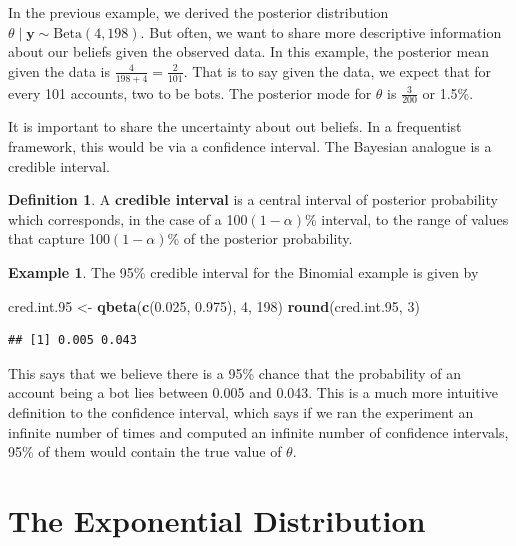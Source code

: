 \documentclass[
]{book}
\newenvironment{Shaded}{\begin{snugshade}}{\end{snugshade}}
\newcommand{\DecValTok}[1]{\textcolor[rgb]{0.00,0.00,0.81}{#1}}
\newcommand{\FloatTok}[1]{\textcolor[rgb]{0.00,0.00,0.81}{#1}}
\newcommand{\FunctionTok}[1]{\textcolor[rgb]{0.13,0.29,0.53}{\textbf{#1}}}
\newcommand{\NormalTok}[1]{#1}
\newcommand{\OtherTok}[1]{\textcolor[rgb]{0.56,0.35,0.01}{#1}}
\theoremstyle{definition}
\newtheorem{definition}{Definition}[chapter]
\theoremstyle{definition}
\newtheorem{example}{Example}[chapter]
\theoremstyle{definition}
\theoremstyle{definition}
\theoremstyle{remark}
\begin{document}
In the previous example, we derived the posterior distribution \(\theta \mid \boldsymbol{y} \sim \textrm{Beta}(4, 198)\). But often, we want to share more descriptive information about our beliefs given the observed data. In this example, the posterior mean given the data is \(\frac{4}{198+4} = \frac{2}{101}\). That is to say given the data, we expect that for every 101 accounts, two to be bots. The posterior mode for \(\theta\) is \(\frac{3}{200}\) or 1.5\%.

It is important to share the uncertainty about out beliefs. In a frequentist framework, this would be via a confidence interval. The Bayesian analogue is a credible interval.

\begin{definition}
A \textbf{credible interval} is a central interval of posterior probability which corresponds, in the case of a 100\((1-\alpha)\)\% interval, to the range of values that capture 100\((1-\alpha)\)\% of the posterior probability.
\end{definition}

\begin{example}
The 95\% credible interval for the Binomial example is given by

\begin{Shaded}
\begin{Highlighting}[]
\NormalTok{cred.int}\FloatTok{.95} \OtherTok{\textless{}{-}} \FunctionTok{qbeta}\NormalTok{(}\FunctionTok{c}\NormalTok{(}\FloatTok{0.025}\NormalTok{, }\FloatTok{0.975}\NormalTok{), }\DecValTok{4}\NormalTok{, }\DecValTok{198}\NormalTok{)}
\FunctionTok{round}\NormalTok{(cred.int}\FloatTok{.95}\NormalTok{, }\DecValTok{3}\NormalTok{)}
\end{Highlighting}
\end{Shaded}

\begin{verbatim}
## [1] 0.005 0.043
\end{verbatim}

This says that we believe there is a 95\% chance that the probability of an account being a bot lies between 0.005 and 0.043. This is a much more intuitive definition to the confidence interval, which says if we ran the experiment an infinite number of times and computed an infinite number of confidence intervals, 95\% of them would contain the true value of \(\theta\).
\end{example}

\hypertarget{the-exponential-distribution}{%
\section{The Exponential Distribution}\label{the-exponential-distribution}}
\end{document}
